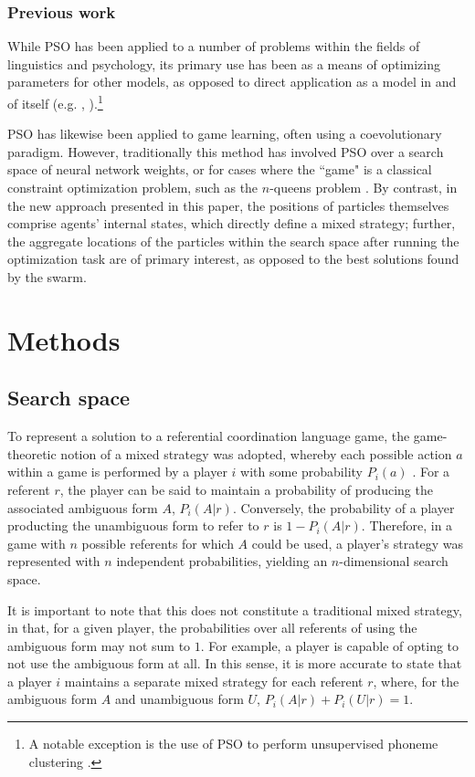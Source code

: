 \documentclass[a4paper,11pt]{article}
\begin{document}
\subsubsection{Previous work}
\label{sec:pso_prev_work}

While PSO has been applied to a number of problems within the fields of linguistics and psychology, its primary use has been as a means of optimizing parameters for other models, as opposed to direct application as a model in and of itself (e.g. \citeauthor{mehdad2009}, ).\footnote{A notable exception is the use of PSO to perform unsupervised phoneme clustering \cite{ahmadi2007}.}

PSO has likewise been applied to game learning, often using a coevolutionary paradigm. However, traditionally this method has involved PSO over a search space of neural network weights, or for cases where the ``game" is a classical constraint optimization problem, such as the $n$-queens problem \cite{engelbrecht2005}. By contrast, in the new approach presented in this paper, the positions of particles themselves comprise agents' internal states, which directly define a mixed strategy; further, the aggregate locations of the particles within the search space after running the optimization task are of primary interest, as opposed to the best solutions found by the swarm.


\section{Methods}
\subsection{Search space}
\label{sec:search_space}
To represent a solution to a referential coordination language game, the game-theoretic notion of a mixed strategy was adopted, whereby each possible action $a$ within a game is performed by a player $i$ with some probability $P_i(a)$ \cite{benz2005}. For a referent $r$, the player can be said to maintain a probability of producing the associated ambiguous form $A$, $P_i(A|r)$. Conversely, the probability of a player producting the unambiguous form to refer to $r$ is $1 - P_i(A|r)$. Therefore, in a game with $n$ possible referents for which $A$ could be used, a player's strategy was represented with $n$ independent probabilities, yielding an $n$-dimensional search space. 

It is important to note that this does not constitute a traditional mixed strategy, in that, for a given player, the probabilities over all referents of using the ambiguous form may not sum to $1$.  For example, a player is capable of opting to not use the ambiguous form at all. In this sense, it is more accurate to state that a player $i$ maintains a separate mixed strategy for each referent $r$, where, for the ambiguous form $A$ and unambiguous form $U$, $P_i(A|r) + P_i(U|r) = 1$.
\end{document}
